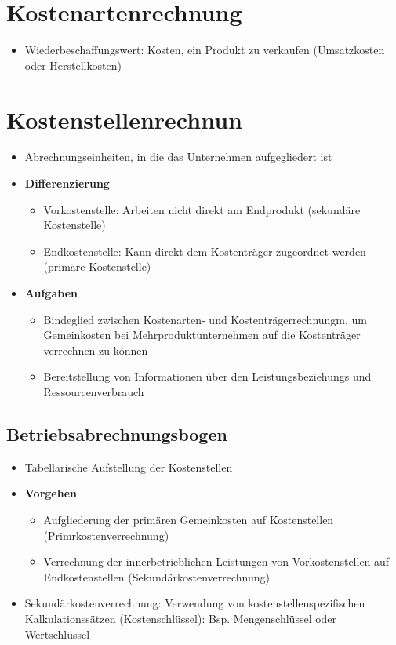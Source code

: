 \section{Kostenartenrechnung}
\begin{itemize}
	\item Wiederbeschaffungswert: Kosten, ein Produkt zu verkaufen (Umsatzkosten oder Herstellkosten)
\end{itemize}



\section{Kostenstellenrechnun}
\begin{itemize}
	\item Abrechnungseinheiten, in die das Unternehmen aufgegliedert ist
	\item \textbf{Differenzierung}
	\begin{itemize}
		\item Vorkostenstelle: Arbeiten nicht direkt am Endprodukt (sekundäre Kostenstelle)
		\item Endkostenstelle: Kann direkt dem Kostenträger zugeordnet werden (primäre Kostenstelle)
	\end{itemize}
	\item \textbf{Aufgaben}
	\begin{itemize}
		\item Bindeglied zwischen Kostenarten- und Kostenträgerrechnungm, um Gemeinkosten bei Mehrproduktunternehmen auf die Kostenträger verrechnen zu können
		\item Bereitstellung von Informationen über den Leistungsbeziehungs und Ressourcenverbrauch
	\end{itemize}
\end{itemize}


\subsection{Betriebsabrechnungsbogen}
\begin{itemize}
	\item Tabellarische Aufstellung der Kostenstellen
	\item \textbf{Vorgehen}
	\begin{itemize}
		\item Aufgliederung der primären Gemeinkosten auf Kostenstellen (Primrkostenverrechnung)
		\item Verrechnung der innerbetrieblichen Leistungen von Vorkostenstellen auf Endkostenstellen (Sekundärkostenverrechnung)
	\end{itemize}
	\item Sekundärkostenverrechnung: Verwendung von kostenstellenspezifischen Kalkulationssätzen (Kostenschlüssel): Bsp. Mengenschlüssel oder Wertschlüssel
\end{itemize}



